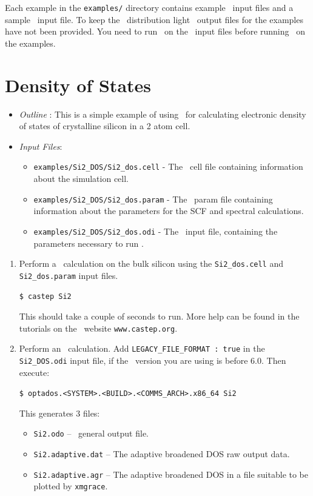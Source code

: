 \documentclass[a4paper,11pt,twoside]{book}
\begin{document}
{Each example in the \verb#examples/# directory contains example \castep\ input files and a sample \optados\ input file. To keep the \optados\ distribution light \castep\ output files for the examples have not been provided. You need to run \castep\ on the \castep\ input files before running \optados\ on the examples.

\section{Density of States}
\begin{itemize}
\item \emph{Outline} : This is a simple example of using \optados\ for calculating electronic density of states of crystalline silicon in a 2 atom cell.
\item \emph{Input Files}:
\begin{itemize}
\item \verb#examples/Si2_DOS/Si2_dos.cell# - The \castep\ cell file containing information about the simulation cell.
\item \verb#examples/Si2_DOS/Si2_dos.param# - The \castep\ param file containing information about the parameters for the SCF and spectral calculations.
\item \verb#examples/Si2_DOS/Si2_dos.odi# - The \optados\ input file, containing the parameters necessary to run \optados.
\end{itemize}
\end{itemize}

\begin{enumerate}
\item Perform a \castep\ calculation on the bulk silicon using the  \verb#Si2_dos.cell#  and \verb#Si2_dos.param# input files.

  \verb#$ castep Si2#

This should take a couple of seconds to run. More help can be found in  the tutorials  on  the \castep\ website \verb#www.castep.org#.

\item Perform an \optados\ calculation.  Add \verb#LEGACY_FILE_FORMAT : true# in the \verb#Si2_DOS.odi# input file, if the \castep\ version you are using is before 6.0. Then execute:

\verb#$ optados.<SYSTEM>.<BUILD>.<COMMS_ARCH>.x86_64 Si2#

This generates 3 files:
\begin{itemize}
\item \verb#Si2.odo# -- \optados\ general output file.
\item \verb#Si2.adaptive.dat# -- The adaptive broadened DOS raw output data.
\item  \verb#Si2.adaptive.agr# -- The adaptive broadened DOS in a file suitable to be plotted by  \verb#xmgrace#.
\end{itemize}


\end{enumerate}}
\end{document}
